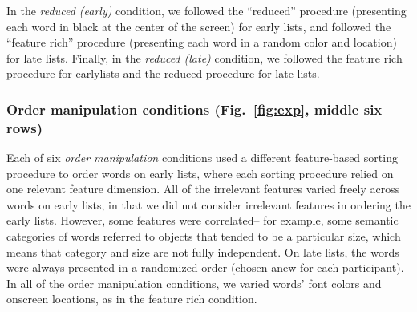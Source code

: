 \documentclass[11pt]{article}
\begin{document}
In the \textit{reduced (early)} condition, we followed the ``reduced''
procedure (presenting each word in black at the center of the screen) for early
lists, and followed the ``feature rich'' procedure (presenting each word in a
random color and location) for late lists. Finally, in the \textit{reduced
(late)} condition, we followed the feature rich procedure for earlylists and
the reduced procedure for late lists.

\subsubsection*{Order manipulation conditions (Fig.~\ref{fig:exp}, middle six
rows)}

Each of six \textit{order manipulation} conditions used a different
feature-based sorting procedure to order words on early lists, where each
sorting procedure relied on one relevant feature dimension. All of the
irrelevant features varied freely across words on early lists, in that we did
not consider irrelevant features in ordering the early lists. However, some
features were correlated-- for example, some semantic categories of words
referred to objects that tended to be a particular size, which means that
category and size are not fully independent. On late lists, the words were
always presented in a randomized order (chosen anew for each participant). In
all of the order manipulation conditions, we varied words' font colors and
onscreen locations, as in the feature rich condition.
\end{document}
